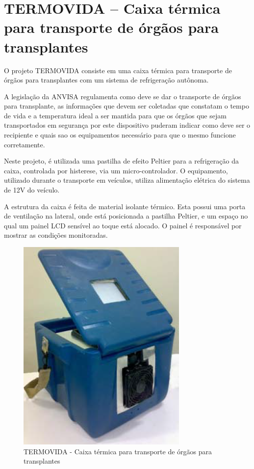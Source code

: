 \section{TERMOVIDA – Caixa térmica para transporte de órgãos para transplantes}

O projeto TERMOVIDA consiste em uma caixa térmica para transporte de órgãos para transplantes com um sistema de refrigeração autônoma.

A legislação da ANVISA regulamenta como deve se dar o transporte de órgãos para transplante, as informações que devem ser coletadas que constatam o tempo de vida e a temperatura ideal a ser mantida para que os órgãos que sejam transportados em segurança por este dispositivo puderam indicar como deve ser o recipiente e quais sao os equipamentos necessário para que o mesmo funcione corretamente.

Neste projeto, é utilizada uma pastilha de efeito Peltier para a refrigeração da caixa, controlada por histerese, via um micro-controlador. O equipamento, utilizado durante o transporte em veículos, utiliza alimentação elétrica do sistema de 12V do veículo.

A estrutura da caixa é feita de material isolante térmico. Esta possui uma porta de ventilação na lateral, onde está posicionada a pastilha Peltier, e um espaço no qual um painel LCD sensível ao toque está alocado. O painel é responsável por mostrar as condições monitoradas.

\begin{figure}[H]
\centering
\includegraphics[scale=1]{figuras/termovida.png}
\caption{TERMOVIDA - Caixa térmica para transporte de órgãos para transplantes}
\end{figure}
